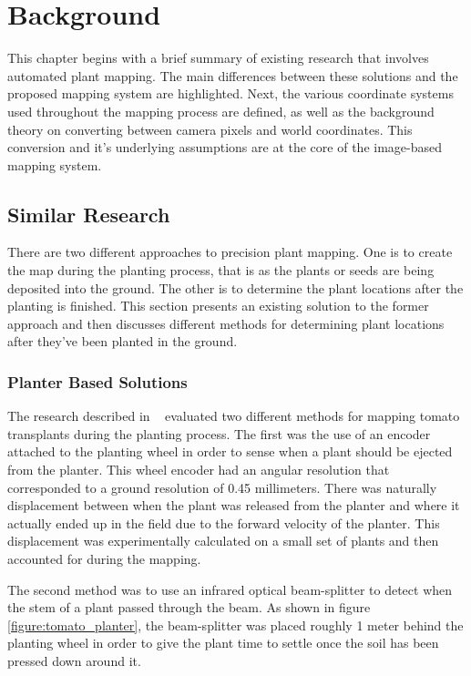 
\cleardoublepage

\chapter{Background}
\label{background}

This chapter begins with a brief summary of existing research that involves automated plant mapping.  The main differences between these solutions and the proposed mapping system are highlighted.  Next, the various coordinate systems used throughout the mapping process are defined, as well as the background theory on converting between camera pixels and world coordinates.  This conversion and it's underlying assumptions are at the core of the image-based mapping system. 

\section{Similar Research}
\label{section:similar_research}

There are two different approaches to precision plant mapping.  One is to create the map during the planting process, that is as the plants or seeds are being deposited into the ground.  The other is to determine the plant locations after the planting is finished.  This section presents an existing solution to the former approach and then discusses different methods for determining plant locations after they've been planted in the ground. 

\subsection{Planter Based Solutions}

The research described in ~\citep{Sun:2010} evaluated two different methods for mapping tomato transplants during the planting process.  The first was the use of an encoder attached to the planting wheel in order to sense when a plant should be ejected from the planter. This wheel encoder had an angular resolution that corresponded to a ground resolution of 0.45 millimeters.  There was naturally displacement between when the plant was released from the planter and where it actually ended up in the field due to the forward velocity of the planter.  This displacement was experimentally calculated on a small set of plants and then accounted for during the mapping.  

The second method was to use an infrared optical beam-splitter to detect when the stem of a plant passed through the beam.  As shown in figure \ref{figure:tomato_planter}, the beam-splitter was placed roughly 1 meter behind the planting wheel in order to give the plant time to settle once the soil has been pressed down around it.  

